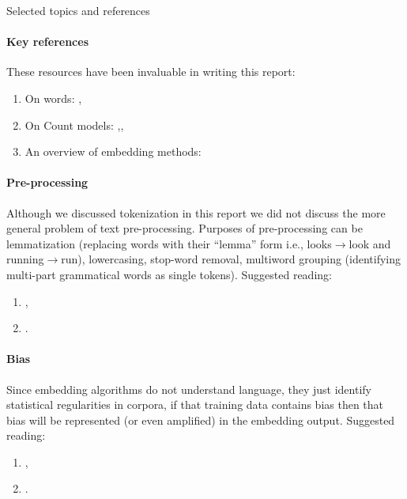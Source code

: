 \documentclass{ucetd}
\begin{document}
\begin{infobox}{Selected topics and references}{\small
  \paragraph{Key references} These resources have been invaluable in writing this report:\hspace{1.4em}
  \begin{enumerate}
    \item On words: \emph{} \parencite{halliday-2004-lexicology, dixon02-word},\vspace{-0.5em}
    \item On Count models: \emph{} \parencite{turney10-from-frequen-to-meanin, sahlgreen-2006-the-word-space-model},\vspace{-0.5em}, 
    \item An overview of embedding methods: \emph{} \parencite{wang-2019-evaluating}
    \end{enumerate}
  \paragraph{Pre-processing}
  Although we discussed tokenization in this report we did not discuss the more general problem of text pre-processing. Purposes of pre-processing can be lemmatization (replacing words with their ``lemma'' form i.e., looks$\rightarrow$look and running$\rightarrow$run), lowercasing, stop-word removal, multiword grouping (identifying multi-part grammatical words as single tokens). Suggested reading:
  \begin{enumerate}
    \item \emph{} \parencite{uysal-2014-the-impact-of-preprocessing},\vspace{-0.5em}
    \item \emph{} \parencite{camacho-collados17-role-text-prepr-neural-networ-archit}.
  \end{enumerate}
  \paragraph{Bias}\label{para:bias}
  Since embedding algorithms do not understand language, they just identify statistical regularities in corpora, if that training data contains bias then that bias will be represented (or even amplified) in the embedding output. Suggested reading:
  \begin{enumerate}
    \item \emph{} \parencite{caliskan-2017-semantics-derived},\vspace{-0.5em}
    \item \emph{} \parencite{bolukbasi16-man-is-to-comput-progr}.
  \end{enumerate}
}\end{infobox}
\end{document}
